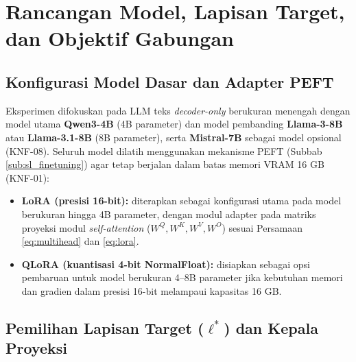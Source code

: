 \section{Rancangan Model, Lapisan Target, dan Objektif Gabungan}
\label{sec:ds_model_objektif}

\subsection{Konfigurasi Model Dasar dan Adapter PEFT}
\label{sub:ds_model}

Eksperimen difokuskan pada LLM teks \textit{decoder-only} berukuran menengah dengan model utama \textbf{Qwen3-4B} (4B parameter) dan model pembanding \textbf{Llama-3-8B} atau \textbf{Llama-3.1-8B} (8B parameter), serta \textbf{Mistral-7B} sebagai model opsional (KNF-08). Seluruh model dilatih menggunakan mekanisme PEFT (Subbab \ref{sub:sl_finetuning}) agar tetap berjalan dalam batas memori VRAM 16 GB (KNF-01):
\begin{itemize}
  \item \textbf{LoRA (presisi 16-bit):} diterapkan sebagai konfigurasi utama pada model berukuran hingga 4B parameter, dengan modul adapter pada matriks proyeksi modul \textit{self-attention} ($W^Q, W^K, W^V, W^O$) sesuai Persamaan \ref{eq:multihead} dan \ref{eq:lora}.
  \item \textbf{QLoRA (kuantisasi 4-bit NormalFloat):} disiapkan sebagai opsi pembaruan untuk model berukuran 4--8B parameter \autocite{dettmers2023qloraefficientfinetuningquantized} jika kebutuhan memori dan gradien dalam presisi 16-bit melampaui kapasitas 16 GB.
\end{itemize}

\subsection{Pemilihan Lapisan Target ($\ell^*$) dan Kepala Proyeksi}
\label{sub:ds_lapisan}

